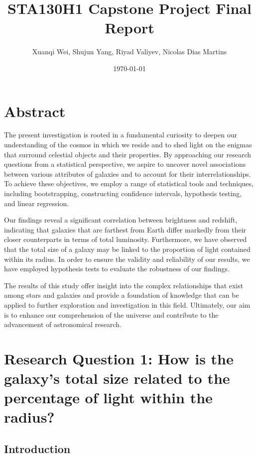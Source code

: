\documentclass[12pt]{article}
\title{STA130H1 Capstone Project Final Report}
\author{Xuanqi Wei, Shujun Yang, Riyad Valiyev, Nicolas Dias Martins}
\date{\today}
\begin{document}
\maketitle
\thispagestyle{empty}

\newpage

\tableofcontents
\thispagestyle{empty}

\newpage

\setcounter{page}{1}

\section{Abstract}
The present investigation is rooted in a fundamental curiosity to deepen our understanding of the cosmos in which we reside and to shed light on the enigmas that surround celestial objects and their properties. By approaching our research questions from a statistical perspective, we aspire to uncover novel associations between various attributes of galaxies and to account for their interrelationships. To achieve these objectives, we employ a range of statistical tools and techniques, including bootstrapping, constructing confidence intervals, hypothesis testing, and linear regression.

\noindent
Our findings reveal a significant correlation between brightness and redshift, indicating that galaxies that are farthest from Earth differ markedly from their closer counterparts in terms of total luminosity. Furthermore, we have observed that the total size of a galaxy may be linked to the proportion of light contained within its radius. In order to ensure the validity and reliability of our results, we have employed hypothesis tests to evaluate the robustness of our findings.

\noindent
The results of this study offer insight into the complex relationships that exist among stars and galaxies and provide a foundation of knowledge that can be applied to further exploration and investigation in this field. Ultimately, our aim is to enhance our comprehension of the universe and contribute to the advancement of astronomical research.

\newpage

\section{Research Question 1: How is the galaxy's total size related to the percentage of light within the radius?}

\subsection{Introduction}
\end{document}
